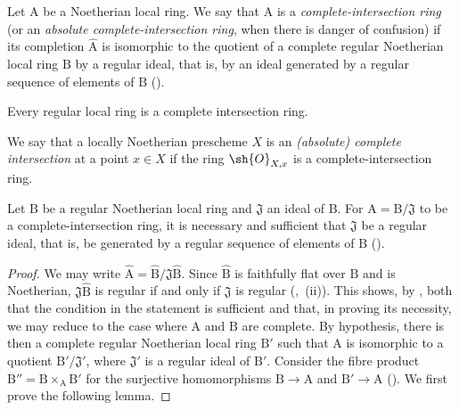 \begin{definition}[19.3.1]
\label{IV.19.3.1}
Let $\mathrm{A}$ be a Noetherian local ring.
We say that $\mathrm{A}$ is a \emph{complete-intersection ring} (or an \emph{absolute complete-intersection ring}, when there is danger of confusion) if its completion $\widehat{\mathrm{A}}$ is isomorphic to the quotient of a complete regular Noetherian local ring $\mathrm{B}$ by a regular ideal, that is, by an ideal generated by a regular sequence of elements of $\mathrm{B}$ ().

Every regular local ring is a complete intersection ring.

We say that a locally Noetherian prescheme $X$ is an \emph{(absolute) complete intersection} at a point $x\in X$ if the ring $\sh{O}_{X,x}$ is a complete-intersection ring.
\end{definition}

\begin{proposition}[19.3.2]
\label{IV.19.3.2}
Let $\mathrm{B}$ be a regular Noetherian local ring and $\mathfrak{J}$ an ideal of $\mathrm{B}$.
For $\mathrm{A}=\mathrm{B}/\mathfrak{J}$ to be a complete-intersection ring, it is necessary and sufficient that $\mathfrak{J}$ be a regular ideal, that is, be generated by a regular sequence of elements of $\mathrm{B}$ ().
\end{proposition}

\begin{proof}
We may write $\widehat{\mathrm{A}}=\widehat{\mathrm{B}}/\mathfrak{J}\widehat{\mathrm{B}}$. Since $\widehat{\mathrm{B}}$ is faithfully flat over $\mathrm{B}$ and is Noetherian, $\mathfrak{J}\widehat{\mathrm{B}}$ is regular if and only if $\mathfrak{J}$ is regular (,~(ii)).
This shows, by , both that the condition in the statement is sufficient and that, in proving its necessity, we may reduce to the case where $\mathrm{A}$ and $\mathrm{B}$ are complete.
By hypothesis, there is then a complete regular Noetherian local ring $\mathrm{B}'$ such that $\mathrm{A}$ is isomorphic to a quotient $\mathrm{B}'/\mathfrak{J}'$, where $\mathfrak{J}'$ is a regular ideal of $\mathrm{B}'$.
Consider the fibre product $\mathrm{B}''=\mathrm{B}\times_{\mathrm{A}}\mathrm{B}'$ for the surjective homomorphisms $\mathrm{B}\to\mathrm{A}$ and $\mathrm{B}'\to\mathrm{A}$ (). We first prove the following lemma.
\end{proof}

